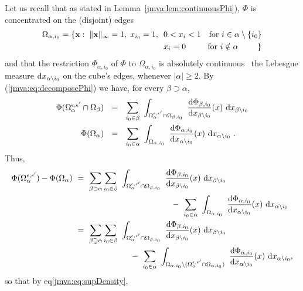 Let us recall that as stated in Lemma~\ref{jmva:lem:continuousPhi}), $ \Phi$ is concentrated on the (disjoint) edges 
\begin{align*}
   \Omega_{\alpha,i_0} = \{\mathbf x: \; \| {\mathbf x}\|_{\infty}  = 1,\; x_{i_0} = 1,~~& 0<  x_i < 1 ~~\text{~for~} i \in \alpha \setminus \{i_0\}\\
&x_i=0 ~~~~\text{~~~ for } i\notin \alpha ~~~~~~~\}
\end{align*}
and that the restriction $\Phi_{\alpha,i_0}$ of $\Phi$ to $\Omega_{\alpha,i_0}$ is absolutely continuous \wrt~the Lebesgue measure $\mathrm{d} x_{\alpha\setminus{i_0}}$ on the cube's edges, whenever $|\alpha|\ge 2 $.
\noindent
By (\ref{jmva:eq:decomposePhi}) we have, for every $\beta \supset \alpha$, 
\begin{align*}
\Phi(\Omega_\alpha^{\epsilon, \epsilon'} \cap \Omega_{\beta})~~&=~~ \sum_{i_0 \in \beta} ~\int_{\Omega_\alpha^{\epsilon, \epsilon'} \cap \Omega_{\beta,i_0}}  ~\frac{\mathrm{d} \Phi_{\beta,i_0}}{\mathrm{d} x_{ \beta \setminus i_0}}(x) ~\mathrm{d} x_{\beta \setminus i_0}\\
\Phi(\Omega_\alpha)~~&=~~ \sum_{i_0 \in \alpha} ~\int_{\Omega_{\alpha,i_0}}  ~\frac{\mathrm{d} \Phi_{\alpha,i_0}}{\mathrm{d} x_{ \alpha \setminus i_0}}(x) ~\mathrm{d} x_{\alpha \setminus i_0}~.
\end{align*}
Thus,
\begin{align*}
\Phi(\Omega_\alpha^{\epsilon, \epsilon'}) - \Phi(\Omega_\alpha) &~=~ \sum_{\beta \supset \alpha} \sum_{i_0 \in \beta} ~\int_{\Omega_\alpha^{\epsilon, \epsilon'} \cap \Omega_{\beta,i_0}}  ~\frac{\mathrm{d} \Phi_{\beta,i_0}}{\mathrm{d} x_{ \beta \setminus i_0}}(x) ~\mathrm{d} x_{\beta \setminus i_0}\\
&~~~~~~~~~~~~~~~~~~~~~~~~~~~~~~~~~~~~-~\sum_{i_0 \in \alpha} ~\int_{\Omega_{\alpha,i_0}}  ~\frac{\mathrm{d} \Phi_{\alpha,i_0}}{\mathrm{d} x_{ \alpha \setminus i_0}}(x) ~\mathrm{d} x_{\alpha \setminus i_0}\\
&~=~ \sum_{\beta \supsetneq \alpha} \sum_{i_0 \in \beta} ~\int_{\Omega_\alpha^{\epsilon, \epsilon'} \cap \Omega_{\beta,i_0}}  ~\frac{\mathrm{d} \Phi_{\beta,i_0}}{\mathrm{d} x_{ \beta \setminus i_0}}(x) ~\mathrm{d} x_{\beta \setminus i_0}\\
&~~~~~~~~~~~~~~~~~~~~~-~\sum_{i_0 \in \alpha} ~\int_{\Omega_{\alpha,i_0} \setminus (\Omega_\alpha^{\epsilon, \epsilon'} \cap \Omega_{\alpha,i_0})}  ~\frac{\mathrm{d} \Phi_{\alpha,i_0}}{\mathrm{d} x_{ \alpha \setminus i_0}}(x) ~\mathrm{d} x_{\alpha \setminus i_0},
\end{align*}
so that by eq\ref{jmva:eq:supDensity}, 
